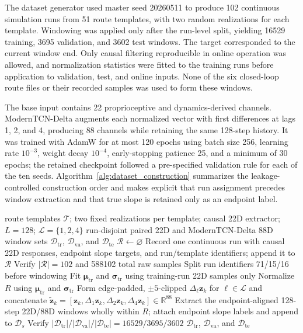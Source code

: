 \documentclass{ieeeaccess}
\begin{document}
The dataset generator used master seed 20260511 to produce 102 continuous simulation runs from 51 route templates, with two random realizations for each template. Windowing was applied only after the run-level split, yielding 16529 training, 3695 validation, and 3602 test windows. The target corresponded to the current window end. Only causal filtering reproducible in online operation was allowed, and normalization statistics were fitted to the training runs before application to validation, test, and online inputs. None of the six closed-loop route files or their recorded samples was used to form these windows.

The base input contains 22 proprioceptive and dynamics-derived channels. ModernTCN-Delta augments each normalized vector with first differences at lags 1, 2, and 4, producing 88 channels while retaining the same 128-step history. It was trained with AdamW for at most 120 epochs using batch size 256, learning rate $10^{-3}$, weight decay $10^{-4}$, early-stopping patience 25, and a minimum of 30 epochs; the retained checkpoint followed a pre-specified validation rule for each of the ten seeds. Algorithm~\ref{alg:dataset_construction} summarizes the leakage-controlled construction order and makes explicit that run assignment precedes window extraction and that true slope is retained only as an endpoint label.

\begin{algorithm}[!t]
\caption{Leakage-controlled construction of run-disjoint 22D and 88D datasets}
\label{alg:dataset_construction}
\begin{algorithmic}[1]
 route templates $\mathcal T$; two fixed realizations per template; causal 22D extractor; $L=128$; $\mathcal L=\{1,2,4\}$
\Ensure run-disjoint paired 22D and ModernTCN-Delta 88D window sets $\mathcal D_{\mathrm{tr}}$, $\mathcal D_{\mathrm{va}}$, and $\mathcal D_{\mathrm{te}}$
\State $\mathcal R\gets\varnothing$
    \State Record one continuous run with causal 22D responses, endpoint slope targets, and run/template identifiers; append it to $\mathcal R$
\EndFor
\State Verify $|\mathcal R|=102$ and 588102 total raw samples
\State Split run identifiers 71/15/16 before windowing 
\State Fit $\boldsymbol\mu_{\mathrm{tr}}$ and $\boldsymbol\sigma_{\mathrm{tr}}$ using training-run 22D samples only
    \State Normalize $R$ using $\boldsymbol\mu_{\mathrm{tr}}$ and $\boldsymbol\sigma_{\mathrm{tr}}$
    \State Form edge-padded, $\pm5$-clipped $\Delta_{\ell}\mathbf z_k$ for $\ell\in\mathcal L$ and concatenate $\widetilde{\mathbf z}_k=[\mathbf z_k,\Delta_1\mathbf z_k,\Delta_2\mathbf z_k,\Delta_4\mathbf z_k]\in\mathbb R^{88}$
    \State Extract the endpoint-aligned 128-step 22D/88D windows wholly within $R$; attach endpoint slope labels and append to $\mathcal D_s$
\EndFor
\State Verify $|\mathcal D_{\mathrm{tr}}|/|\mathcal D_{\mathrm{va}}|/|\mathcal D_{\mathrm{te}}|=16529/3695/3602$
\State \Return $\mathcal D_{\mathrm{tr}}$, $\mathcal D_{\mathrm{va}}$, and $\mathcal D_{\mathrm{te}}$
\end{algorithmic}
\end{algorithm}
\end{document}
